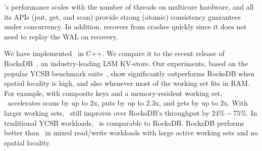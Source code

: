 \sys's performance scales with the number of threads on multicore hardware, 
and all its APIs (put, get, and scan) provide strong (atomic) consistency guarantees 
under concurrency. 
In addition, \sys\/ recovers from crashes quickly since it does not need to replay the WAL on recovery.

We have implemented \sys\ in C++. 
We compare it to the recent release of RocksDB~\cite{RocksDB}, 
an industry-leading LSM KV-store.
Our experiments, based on the popular YCSB benchmark suite~\cite{YCSB}, 
show \sys\/ significantly outperforms RocksDB when spatial  locality is high, and also 
whenever most of the working set fits in RAM. For example, with composite keys and a memory-resident 
working set, \sys\  accelerates scans by up to $2$x, puts by up to $2.3$x, and gets by up to $2$x. 
With larger working sets, \sys\ still improves over RocksDB's throughput by $24\% - 75\%$. In traditional
YCSB workloads,  \sys\ is comparable to RocksDB. RocksDB performs better than 
\sys\ in mixed read/write workloads with large active working sets and no spatial locality. 

